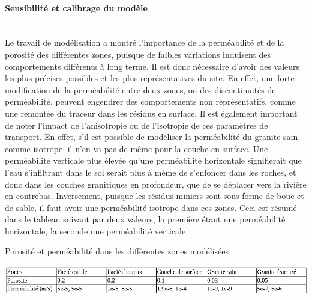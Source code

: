 \documentclass{article}
\begin{document}
\paragraph{Sensibilité et calibrage du modèle \\ \\}
Le travail de modélisation a montré l’importance de la perméabilité et de la porosité des différentes zones, puisque de faibles variations induisent des comportements différents à long terme. Il est donc nécessaire d’avoir des valeurs les plus précises possibles et les plus représentatives du site. En effet, une forte modification de la perméabilité entre deux zones, ou des discontinuités de perméabilité, peuvent engendrer des comportements non représentatifs, comme une remontée du traceur dans les résidus en surface. Il est également important de noter l'impact de l'anisotropie ou de l'isotropie de ces paramètres de transport. En effet, s'il est possible de modéliser la perméabilité du granite sain comme isotrope, il n'en va pas de même pour la couche en surface. Une perméabilité verticale plus élevée qu'une perméabilité horizontale signifierait que l'eau s'infiltrant dans le sol serait plus à même de s'enfoncer dans les roches, et donc dans les couches granitiques en profondeur, que de se déplacer vers la rivière en contrebas. Inversement, puisque les résidus miniers sont sous forme de boue et de sable, il faut avoir une perméabilité isotrope dans ces zones. Ceci est résumé dans le tableau suivant par deux valeurs, la première étant une perméabilité horizontale, la seconde une perméabilité verticale.

\begin{table}[H]
    \centering
    \caption{Porosité et perméabilité dans les différentes zones modélisées}
    \includegraphics[width=1.0\linewidth]{recapitulatif_poro_perme.png}
    
    \label{recapitulatif_poro_perm}
\end{table}
\end{document}
